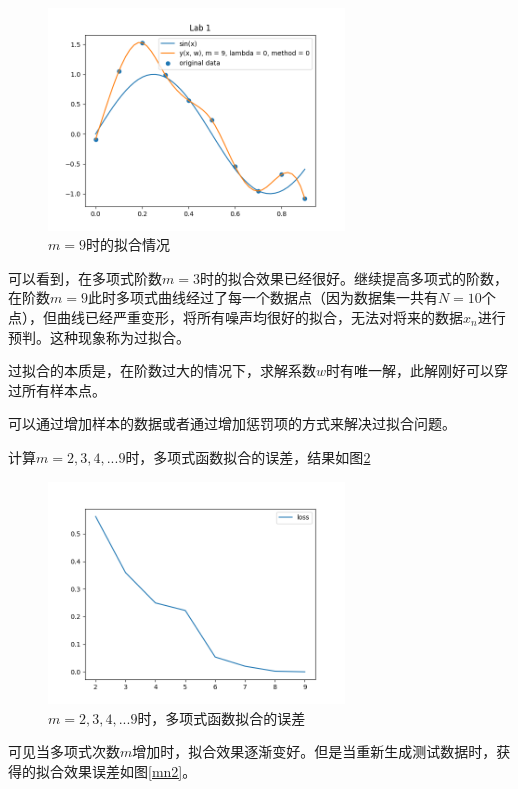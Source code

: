 \begin{figure}[htbp]
    \centering
    \includegraphics[width=0.7\textwidth]{figures/Figure_4.png}
    \caption{$m = 9$时的拟合情况}
    \label{m9}
\end{figure}

可以看到，在多项式阶数$m = 3$时的拟合效果已经很好。继续提高多项式的阶数，在阶数$m = 9$此时多项式曲线经过了每一个数据点（因为数据集一共有$N = 10$个点），但曲线已经严重变形，将所有噪声均很好的拟合，无法对将来的数据$x_n$进行预判。这种现象称为过拟合。

过拟合的本质是，在阶数过大的情况下，求解系数$w$时有唯一解，此解刚好可以穿过所有样本点。

可以通过增加样本的数据或者通过增加惩罚项的方式来解决过拟合问题。

计算$m = 2, 3, 4, ... 9$时，多项式函数拟合的误差，结果如图\ref{mn}

\begin{figure}[htbp]
    \centering
    \includegraphics[width=0.7\textwidth]{figures/Figure_13.png}
    \caption{$m = 2, 3, 4, ... 9$时，多项式函数拟合的误差}
    \label{mn}
\end{figure}

可见当多项式次数$m$增加时，拟合效果逐渐变好。但是当重新生成测试数据时，获得的拟合效果误差如图\ref{mn2}。

